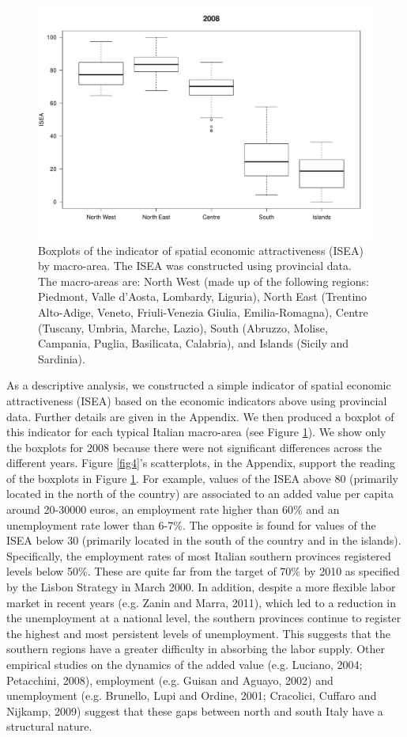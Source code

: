 \begin{figure}[tbp]
\centering
	\includegraphics[width=\textwidth]{it/boxplot.pdf}
\caption{Boxplots of the indicator of spatial economic attractiveness (ISEA) by macro-area. The ISEA was constructed using provincial data. The macro-areas are: North West (made up of the following regions: Piedmont, Valle d'Aosta, Lombardy, Liguria), North East (Trentino Alto-Adige, Veneto, Friuli-Venezia Giulia, Emilia-Romagna), Centre (Tuscany, Umbria, Marche, Lazio), South (Abruzzo, Molise, Campania, Puglia, Basilicata, Calabria), and Islands (Sicily and Sardinia).}
	\label{fig3}
\end{figure} 

As a descriptive analysis, we constructed a simple indicator of spatial economic attractiveness (ISEA) based on the economic indicators above using provincial data. Further details are given in the Appendix. We then produced a boxplot of this indicator for each typical Italian macro-area (see Figure \ref{fig3}). We show only the boxplots for 2008 because there were not significant differences across the different years. Figure \ref{fig4}'s scatterplots, in the Appendix, support the reading of the boxplots in Figure \ref{fig3}. For example, values of the ISEA above 80 (primarily located in the north of the country) are associated to an added value per capita around 20-30000 euros, an employment rate higher than 60\% and an unemployment rate lower than 6-7\%. The opposite is found for values of the ISEA below 30 (primarily located in the south of the country and in the islands). Specifically, the employment rates of most Italian southern provinces registered levels below 50\%. These are quite far from the target of 70\% by 2010 as specified by the Lisbon Strategy in March 2000. In addition, despite a more flexible labor market in recent years (e.g. Zanin and Marra, 2011), which led to a reduction in the unemployment at a national level, the southern provinces continue to register the highest and most persistent levels of unemployment. This suggests that the southern regions have a greater difficulty in absorbing the labor supply. Other empirical studies on the dynamics of the added value (e.g. Luciano, 2004; Petacchini, 2008), employment (e.g. Guisan and Aguayo, 2002) and unemployment (e.g. Brunello, Lupi and Ordine, 2001; Cracolici, Cuffaro and Nijkamp, 2009) suggest that these gaps between north and south Italy have a structural nature. 

